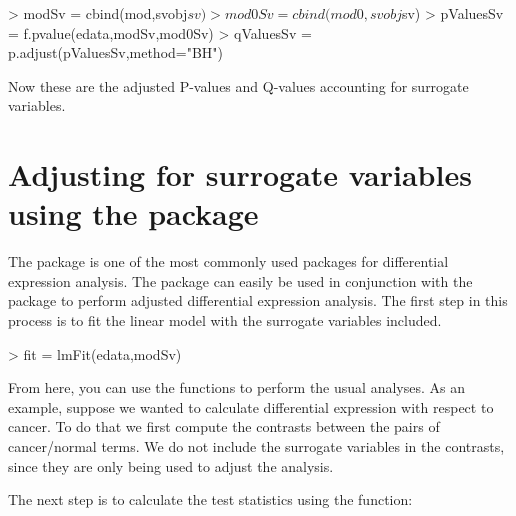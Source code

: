 \documentclass[12pt]{article}
\begin{document}
\begin{Schunk}
\begin{Sinput}
> modSv = cbind(mod,svobj$sv)
> mod0Sv = cbind(mod0,svobj$sv)
> pValuesSv = f.pvalue(edata,modSv,mod0Sv)
> qValuesSv = p.adjust(pValuesSv,method="BH")
\end{Sinput}
\end{Schunk}

Now these are the adjusted P-values and Q-values accounting for surrogate variables. 

\section{Adjusting for surrogate variables using the  package}

The  package is one of the most commonly used packages for differential expression analysis. The  package can easily be used in conjunction with the  package to perform adjusted differential expression analysis. The first step in this process is to fit the linear model with the surrogate variables included.

\begin{Schunk}
\begin{Sinput}
> fit = lmFit(edata,modSv)
\end{Sinput}
\end{Schunk}

From here, you can use the  functions to perform the usual analyses. As an example, suppose we wanted to calculate differential expression with respect to cancer. To do that we first compute the contrasts between the pairs of cancer/normal terms. We do not include the surrogate variables in the contrasts, since they are only being used to adjust the analysis. 

\begin{Schunk}
\end{Schunk}

The next step is to calculate the test statistics using the  function:
\end{document}
